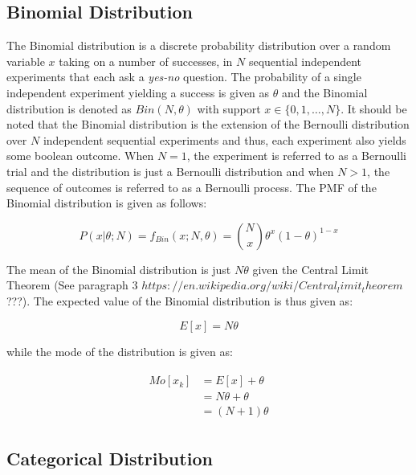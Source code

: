 \subsection{Binomial Distribution}
\label{sec:probability:probability_distributions:bin}


The Binomial distribution is a discrete probability distribution over a random variable $x$ taking on a number of successes, in $N$ sequential independent experiments that each ask a \textit{yes-no} question. The probability of a single independent experiment yielding a success is given as $\theta$ and the Binomial distribution is denoted as $Bin(N, \theta)$ with support $x \in \{0, 1, \dots, N\}$.  It should be noted that the Binomial distribution is the extension of the Bernoulli distribution over $N$ independent sequential experiments and thus, each experiment also yields some boolean outcome. When $N=1$, the experiment is referred to as a Bernoulli trial and the distribution is just a Bernoulli distribution and when $N > 1$, the sequence of outcomes is referred to as a Bernoulli process. The PMF of the Binomial distribution is given as follows:

\begin{equation}
    P(x \vert \theta; N) = f_{Bin}(x; N, \theta) = \binom{N}{x} \theta^{x}(1-\theta)^{1-x}
\end{equation}

The mean of the Binomial distribution is just $N\theta$ given the Central Limit Theorem (See paragraph 3 $https://en.wikipedia.org/wiki/Central_limit_theorem$ ???). The expected value of the Binomial distribution is thus given as:

\begin{equation}
E[x] = N\theta
\end{equation}

while the mode of the distribution is given as:

\begin{align}
\begin{split}
Mo[x_{k}] &= E[x] + \theta \\
	&= N\theta  + \theta \\
	&= (N  + 1)\theta
\end{split}
\end{align}



\subsection{Categorical Distribution}
\label{sec:probability:probability_distributions:categorical}

